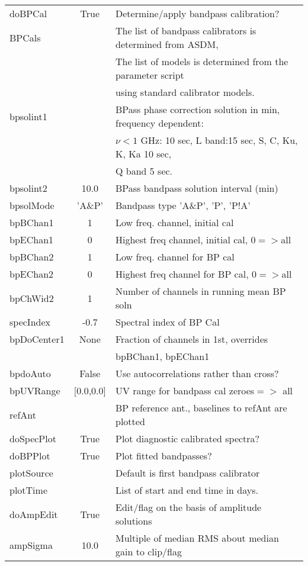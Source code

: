 \documentclass[11pt]{article}
\begin{document}
\begin{enumerate}
\begin{center}
\begin{tabular}{|l|c|l|}
\hline
doBPCal  & True &  Determine/apply bandpass calibration? \\
BPCals  &  & The list of bandpass calibrators is determined from ASDM, \\
  &  & The list of models is determined from the parameter script \\
  & & using standard calibrator models. \\
bpsolint1  &  &  BPass phase correction solution in min, frequency
dependent: \\
 & &  $\nu<1$ GHz: 10 sec, L band:15 sec, S, C, Ku, K, Ka 10 sec,
\\
 & &  Q band 5 sec. \\
bpsolint2  & 10.0 & BPass bandpass solution interval (min) \\
bpsolMode  & 'A\&P'  &  Bandpass type 'A\&P', 'P', 'P!A'\\
bpBChan1  & 1 &  Low freq. channel,  initial cal\\
bpEChan1  & 0 &  Highest freq channel, initial cal, 0$=>$all\\
bpBChan2  & 1 &  Low freq. channel for BP cal\\
bpEChan2  & 0 &  Highest freq channel for BP cal,  0$=>$all \\
bpChWid2  & 1 &  Number of channels in running mean BP soln\\
specIndex & -0.7 & Spectral index of BP Cal \\
bpDoCenter1  & None &  Fraction of  channels in 1st, overrides \\
  &  &  bpBChan1, bpEChan1\\
bpdoAuto  & False &  Use autocorrelations rather than cross?\\
bpUVRange  & [0.0,0.0] &  UV range for bandpass cal zeroes$=>$ all\\
refAnt  &  & BP reference ant., baselines to refAnt are plotted \\
doSpecPlot     & True &  Plot diagnostic calibrated spectra?\\
doBPPlot       & True &  Plot fitted bandpasses?\\
plotSource     & & Default is first bandpass calibrator\\
plotTime       & & List of start and end time in days.\\
doAmpEdit  & True & Edit/flag on the basis of amplitude solutions\\
ampSigma   & 10.0 & Multiple of median RMS about median gain to clip/flag\\

\end{tabular}
\end{center}
\end{enumerate}
\end{document}
